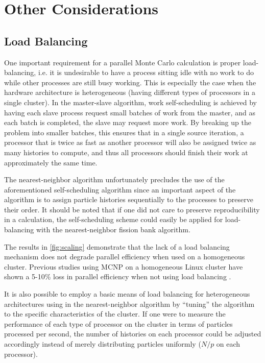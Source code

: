 \section{Other Considerations}
\label{sec:fission-bank-other}

\subsection{Load Balancing}

One important requirement for a parallel Monte Carlo calculation is proper
load-balancing, i.e. it is undesirable to have a process sitting idle with no
work to do while other processes are still busy working. This is especially the
case when the hardware architecture is heterogeneous (having different types of
processors in a single cluster). In the master-slave algorithm, work
self-scheduling is achieved by having each slave process request small batches
of work from the master, and as each batch is completed, the slave may request
more work. By breaking up the problem into smaller batches, this ensures that in
a single source iteration, a processor that is twice as fast as another
processor will also be assigned twice as many histories to compute, and thus all
processors should finish their work at approximately the same time.

The nearest-neighbor algorithm unfortunately precludes the use of the
aforementioned self-scheduling algorithm since an important aspect of the
algorithm is to assign particle histories sequentially to the processes to
preserve their order. It should be noted that if one did not care to preserve
reproducibility in a calculation, the self-scheduling scheme could easily be
applied for load-balancing with the nearest-neighbor fission bank algorithm.

The results in \autoref{fig:scaling} demonstrate that the lack of a load
balancing mechanism does not degrade parallel efficiency when used on a
homogeneous cluster. Previous studies using MCNP on a homogeneous Linux cluster
have shown a 5-10\% loss in parallel efficiency when not using load balancing
\cite{lanl-brown-2005}.

It is also possible to employ a basic means of load balancing for heterogeneous
architectures using in the nearest-neighbor algorithm by ``tuning'' the
algorithm to the specific characteristics of the cluster. If one were to measure
the performance of each type of processor on the cluster in terms of particles
processed per second, the number of histories on each processor could be
adjusted accordingly instead of merely distributing particles uniformly ($N/p$
on each processor).


